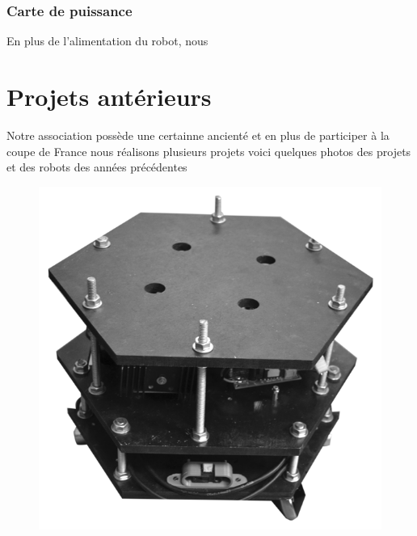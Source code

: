 \documentclass[a4paper,10pt]{article}
\begin{document}
\begin{spacing}{1.5}
\subsubsection{Carte de puissance}
En plus de l'alimentation du robot, nous
\newpage
\section{Projets antérieurs}
Notre association possède une certainne ancienté et en plus de participer à la
coupe de France nous réalisons plusieurs projets voici quelques photos des
projets et des robots des années précédentes
\begin{multicols}{2}
  \begin{figure}[H]
    \center
    \includegraphics[scale=0.3]{1A2018.png}
  \end{figure}
  \columnbreak
  \begin{figure}[H]
    \center

\end{figure}
\end{multicols}
\end{spacing}
\end{document}
